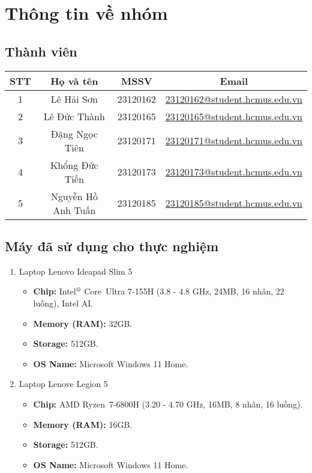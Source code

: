 \section{Thông tin về nhóm}

\subsection{Thành viên}

\begin{center}
    \begin{tabular}{|c|c|c|c|}
        \hline
        STT	& Họ và tên	         & MSSV     & Email \\ \hline
        1	& Lê Hải Sơn	     & 23120162 & \href{mailto:23120162@student.hcmus.edu.vn}{23120162@student.hcmus.edu.vn} \\
        2	& Lê Đức Thành	     & 23120165 & \href{mailto:23120165@student.hcmus.edu.vn}{23120165@student.hcmus.edu.vn} \\
        3	& Đặng Ngọc Tiên	 & 23120171 & \href{mailto:23120171@student.hcmus.edu.vn}{23120171@student.hcmus.edu.vn} \\
        4	& Khổng Đức Tiến	 & 23120173 & \href{mailto:23120173@student.hcmus.edu.vn}{23120173@student.hcmus.edu.vn} \\
        5	& Nguyễn Hồ Anh Tuấn & 23120185 & \href{mailto:23120185@student.hcmus.edu.vn}{23120185@student.hcmus.edu.vn} \\
        \hline
    \end{tabular}
\end{center}

\subsection{Máy đã sử dụng cho thực nghiệm}

\begin{enumerate}
    \item Laptop Lenovo Ideapad Slim 5
    \begin{itemize}
        \item \textbf{Chip:} Intel$^{\text{\textregistered}}$ Core\texttrademark\ 
        Ultra 7-155H (3.8 - 4.8 GHz, 24MB, 16 nhân, 22 luồng), Intel AI.
        \item \textbf{Memory (RAM):} 32GB.
        \item \textbf{Storage:} 512GB.
        \item \textbf{OS Name:} Microsoft Windows 11 Home.
    \end{itemize}
    
    \item Laptop Lenove Legion 5
    \begin{itemize}
        \item \textbf{Chip:} AMD Ryzen\texttrademark\ 7-6800H (3.20 - 
        4.70 GHz, 16MB, 8 nhân, 16 luồng).
        \item \textbf{Memory (RAM):} 16GB.
        \item \textbf{Storage:} 512GB.
        \item \textbf{OS Name:} Microsoft Windows 11 Home.
    \end{itemize}
\end{enumerate}
